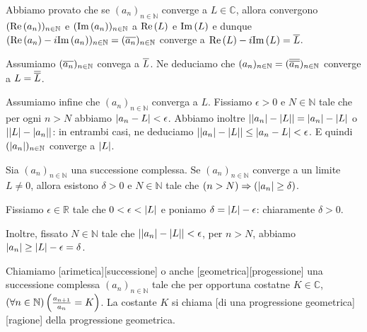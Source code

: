 \par Abbiamo provato che se $(a_n)_{n \in \mathbb{N}}$ converge a $L \in \mathbb{C}$, allora convergono $(\text{Re} \left ( a_n \right ))_{n \in \mathbb{N}}$ e $(\text{Im} \left ( a_n \right ))_{n \in \mathbb{N}}$ a $\text{Re} \left ( L \right )$ e $\text{Im} \left ( L \right )$ e dunque $(\text{Re} \left ( a_n \right ) - i \text{Im} \left ( a_n \right ))_{n \in \mathbb{N}} = (\overline{a_n})_{n \in \mathbb{N}}$ converge a $\text{Re} \left ( L \right ) - i \text{Im} \left ( L \right ) = \overline{L}$.
\par Assumiamo $(\overline{a_n})_{n \in \mathbb{N}}$ convega a $\overline{L}$. Ne deduciamo che $(a_n)_{n \in \mathbb{N}} = (\overline{\overline{a_n}})_{n \in \mathbb{N}}$ converge a $L = \overline{\overline{L}}$.
\par Assumiamo infine che $(a_n)_{n \in \mathbb{N}}$ converga a $L$. Fissiamo $\epsilon > 0$ e $N \in \mathbb{N}$ tale che per ogni $n > N$ abbiamo $\left \lvert a_n - L \right \rvert < \epsilon$. Abbiamo inoltre $\left \lvert \left \lvert a_n \right \rvert - \left \lvert L \right \rvert \right \rvert = \left \lvert a_n \right \rvert - \left \lvert L \right \rvert$ o $\left \lvert \left \lvert L \right \rvert - \left \lvert a_n \right \rvert \right \rvert$: in entrambi casi, ne deduciamo $\left \lvert \left \lvert a_n \right \rvert - \left \lvert L \right \rvert \right \rvert \leq \left \lvert a_n - L \right \rvert < \epsilon$. E quindi $(\left \lvert a_n \right \rvert)_{n \in \mathbb{N}}$ converge a $\left \lvert L \right \rvert$. \EndProof
\begin{Theorem}
	 Sia $(a_n)_{n \in \mathbb{N}}$ una successione complessa. Se $(a_n)_{n \in \mathbb{N}}$ converge a un limite $L \neq 0$, allora esistono $\delta > 0$ e $N \in \mathbb{N}$ tale che $\left ( n > N \right ) \Rightarrow \left ( \left \lvert a_n \right \rvert \geq \delta \right )$.
\end{Theorem}
\Proof Fissiamo $\epsilon \in \mathbb{R}$ tale che $0 < \epsilon < \left \lvert L \right \rvert$ e poniamo $\delta = \left \lvert L \right \rvert - \epsilon$: chiaramente $\delta > 0$.
\par Inoltre, fissato $N \in \mathbb{N}$ tale che $\left \lvert \left \lvert a_n \right \rvert - \left \lvert L \right \rvert \right \rvert < \epsilon$, per $n > N$,  abbiamo $\left \lvert a_n \right \rvert \geq \left \lvert L \right \rvert - \epsilon = \delta$. \EndProof
\begin{Definition}
	Chiamiamo [arimetica][successione] o anche [geometrica][progessione] una successione complessa $(a_n)_{n \in \mathbb{N}}$ tale che per opportuna costatne $K \in \mathbb{C}$, ${\left ( \forall n \in \mathbb{N} \right ) \left ( \frac{a_{n + 1}}{a_n} = K \right )}$. La costante $K$ si chiama [di una progressione geometrica][ragione] della progressione geometrica.
\end{Definition}
